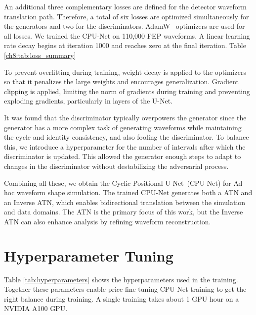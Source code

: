 An additional three complementary losses are defined for the detector waveform translation path. Therefore, a total of six losses are optimized simultaneously for the generators and two for the discriminators. AdamW~\cite{adam_w_paper} optimizers are used for all losses. We trained the CPU-Net on 110,000 FEP waveforms. A linear learning rate decay begins at iteration 1000 and reaches zero at the final iteration. Table \ref{ch8:tab:loss_summary}




To prevent overfitting during training, weight decay is applied to the optimizers so that it penalizes the large weights and encourages generalization. Gradient clipping is applied, limiting the norm of gradients during training and preventing exploding gradients, particularly in layers of the U-Net.

It was found that the discriminator typically overpowers the generator since the generator has a more complex task of generating waveforms while maintaining the cycle and identity consistency, and also fooling the discriminator. To balance this, we introduce a hyperparameter for the number of intervals after which the discriminator is updated. This allowed the generator enough steps to adapt to changes in the discriminator without destabilizing the adversarial process.

Combining all these, we obtain the Cyclic Positional U-Net~(CPU-Net) for Ad-hoc waveform shape simulation. The trained CPU-Net generates both a ATN and an Inverse ATN, which enables bidirectional translation between the simulation and data domains. The ATN is the primary focus of this work, but the Inverse ATN can also enhance analysis by refining waveform reconstruction. 

\section{Hyperparameter Tuning}



Table \ref{tab:hyperparameters} shows the hyperparameters used in the training. Together these parameters enable price fine-tuning CPU-Net training to get the right balance during training. A single training takes about 1 GPU hour on a NVIDIA A100 GPU.